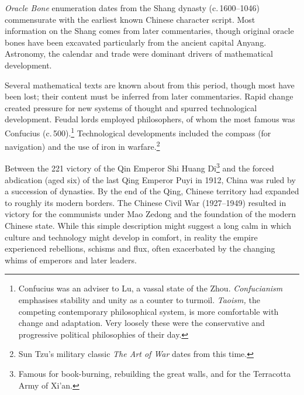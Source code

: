 \begin{description}\itemsep2pt
	\item[Earliest mathematics] \emph{Oracle Bone} enumeration dates from the Shang dynasty (c.\,1600--1046\BC) commensurate with the earliest known Chinese character script. Most information on the Shang comes from later commentaries, though original oracle bones have been excavated particularly from the ancient capital Anyang. Astronomy, the calendar and trade were dominant drivers of mathematical development.

  \item[Zhou dynasty (1046--256\BC) and the Warring States period (475--221\BC)] Several mathematical texts are known about from this period, though most have been lost; their content must be inferred from later commentaries. Rapid change created pressure for new systems of thought and spurred technological development. Feudal lords employed philosophers, of whom the most famous was Confucius (c.\,500\BC).\footnote{%
  Confucius was an adviser to Lu, a vassal state of the Zhou. \emph{Confucianism} emphasises stability and unity as a counter to turmoil. \emph{Taoism,} the competing contemporary philosophical system, is more comfortable with change and adaptation. Very loosely these were the conservative and progressive political philosophies of their day.%
 } Technological developments included the compass (for navigation) and the use of iron in warfare.\footnote{%
 		Sun Tzu's military classic \emph{The Art of War} dates from this time.%
	}
  
  \item[Later history and expansion] Between the 221\BC{} victory of the Qin Emperor Shi Huang Di\footnote{%
  	Famous for book-burning, rebuilding the great walls, and for the Terracotta Army of Xi'an.%
 	} and the forced abdication (aged six) of the last Qing Emperor Puyi in 1912, China was ruled by a succession of dynasties. By the end of the Qing, Chinese territory had expanded to roughly its modern borders. The Chinese Civil War (1927--1949) resulted in victory for the communists under Mao Zedong and the foundation of the modern Chinese state. While this simple description might suggest a long calm in which culture and technology might develop in comfort, in reality the empire experienced rebellions, schisms and flux, often exacerbated by the changing whims of emperors and later leaders.
  

\end{description}
